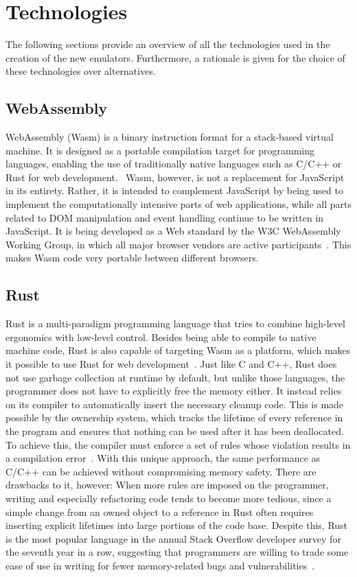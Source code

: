 \section {Technologies}
The following sections provide an overview of all the technologies used in the creation of the new emulators.
Furthermore, a rationale is given for the choice of these technologies over alternatives.

\subsection{WebAssembly}
WebAssembly (Wasm) is a binary instruction format for a stack-based virtual machine. It is designed as a portable compilation target for programming languages, enabling the use of traditionally native languages such as C/C++ or Rust for web development.~\cite{wasmweb}
Wasm, however, is not a replacement for JavaScript in its entirety.
Rather, it is intended to complement JavaScript by being used to implement the computationally intensive parts of web applications, while all parts related to DOM manipulation and event handling continue to be written in JavaScript.
It is being developed as a Web standard by the W3C WebAssembly Working Group, in which all major browser vendors are active participants~\cite{wasmmdn}.
This makes Wasm code very portable between different browsers.

\subsection{Rust}
Rust is a multi-paradigm programming language that tries to combine high-level ergonomics with low-level control. \cite[Introduction]{klabnik2019rust}
Besides being able to compile to native machine code, Rust is also capable of targeting Wasm as a platform, which makes it possible to use Rust for web development~\cite{rustwasm}.
Just like C and C++, Rust does not use garbage collection at runtime by default, but unlike those languages, the programmer does not have to explicitly free the memory either.
It instead relies on its compiler to automatically insert the necessary cleanup code. This is made possible by the ownership system, which tracks the lifetime of every reference in the program and ensures that nothing can be used after it has been deallocated.
To achieve this, the compiler must enforce a set of rules whose violation results in a compilation error~\cite[Chapter~4]{klabnik2019rust}.
With this unique approach, the same performance as C/C++ can be achieved without compromising memory safety.
There are drawbacks to it, however: When more rules are imposed on the programmer, writing and especially refactoring code tends to become more tedious, since a simple change from an owned object to a reference in Rust often requires inserting explicit lifetimes into large portions of the code base.
Despite this, Rust is the most popular language in the annual Stack Overflow developer survey for the seventh year in a row, suggesting that programmers are willing to trade some ease of use in writing for fewer memory-related bugs and vulnerabilities~\cite{sosurvey}.

